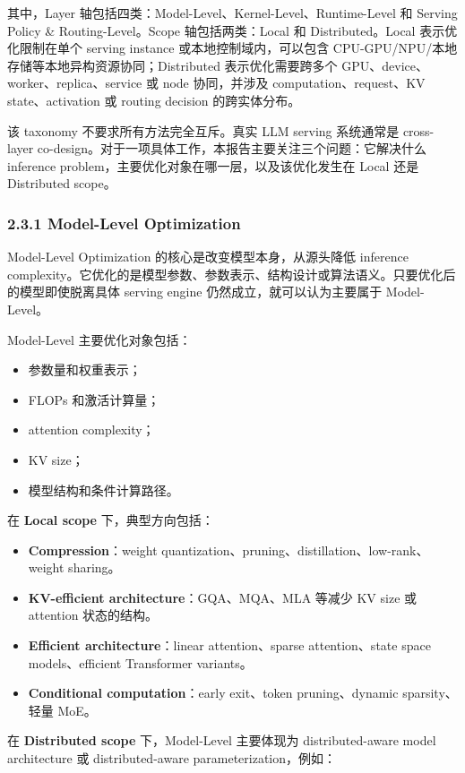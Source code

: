 \documentclass[a4paper,10pt]{ctexart}
\begin{document}
其中，Layer 轴包括四类：Model-Level、Kernel-Level、Runtime-Level 和 Serving Policy \& Routing-Level。Scope 轴包括两类：Local 和 Distributed。Local 表示优化限制在单个 serving instance 或本地控制域内，可以包含 CPU-GPU/NPU/本地存储等本地异构资源协同；Distributed 表示优化需要跨多个 GPU、device、worker、replica、service 或 node 协同，并涉及 computation、request、KV state、activation 或 routing decision 的跨实体分布。


该 taxonomy 不要求所有方法完全互斥。真实 LLM serving 系统通常是 cross-layer co-design。对于一项具体工作，本报告主要关注三个问题：它解决什么 inference problem，主要优化对象在哪一层，以及该优化发生在 Local 还是 Distributed scope。




\subsubsection*{2.3.1 Model-Level Optimization}

Model-Level Optimization 的核心是改变模型本身，从源头降低 inference complexity。它优化的是模型参数、参数表示、结构设计或算法语义。只要优化后的模型即使脱离具体 serving engine 仍然成立，就可以认为主要属于 Model-Level。


Model-Level 主要优化对象包括：


\begin{itemize}
\item 参数量和权重表示；

\item FLOPs 和激活计算量；

\item attention complexity；

\item KV size；

\item 模型结构和条件计算路径。

\end{itemize}
在 \textbf{Local scope} 下，典型方向包括：


\begin{itemize}
\item \textbf{Compression}：weight quantization、pruning、distillation、low-rank、weight sharing。

\item \textbf{KV-efficient architecture}：GQA、MQA、MLA 等减少 KV size 或 attention 状态的结构。

\item \textbf{Efficient architecture}：linear attention、sparse attention、state space models、efficient Transformer variants。

\item \textbf{Conditional computation}：early exit、token pruning、dynamic sparsity、轻量 MoE。

\end{itemize}
在 \textbf{Distributed scope} 下，Model-Level 主要体现为 distributed-aware model architecture 或 distributed-aware parameterization，例如：
\end{document}
